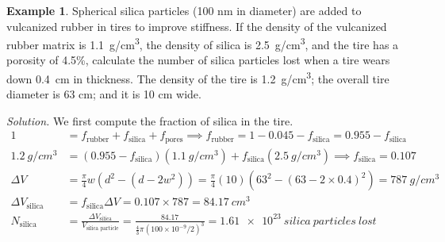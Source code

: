 \documentclass{article}
\theoremstyle{definition}
\newtheorem{example}[definition]{Example}
\begin{document}
\begin{example}
    Spherical silica particles (100 nm in diameter) are added to vulcanized rubber in tires to improve stiffness. If the density of the vulcanized rubber matrix is \SI{1.1}{g/cm^3}, the density of silica is \SI{2.5}{g/cm^3}, and the tire has a porosity of 4.5\%, calculate the number of silica particles lost when a tire wears down \SI{0.4}{cm} in thickness. The density of the tire is \SI{1.2}{g/cm^3}; the overall tire diameter is 63 cm; and it is 10 cm wide.

    \textit{Solution.} We first compute the fraction of silica in the tire.
    \begin{align*}
        1 &= f_{\text{rubber}} + f_{\text{silica}} + f_{\text{pores}} \implies f_{\text{rubber}} = 1 - 0.045 - f_{\text{silica}} = 0.955 - f_{\text{silica}} \\
        \SI{1.2}{g/cm^3} &= (0.955 - f_{\text{silica}}) (\SI{1.1}{g/cm^3}) + f_{\text{silica}} (\SI{2.5}{g/cm^3}) \implies f_{\text{silica}} = 0.107 \\
        \Delta V &= \frac{\pi}{4}w (d^2 - (d-2w^2)) = \frac{\pi}{4} (10) (63^2 - (63-2\times0.4)^2) = \SI{787}{g/cm^3} \\
        \Delta V_{\text{silica}} &= f_{\text{silica}} \Delta V = 0.107 \times 787 = \SI{84.17}{cm^3} \\
        N_{\text{silica}} &= \frac{\Delta V_{\text{silica}}}{V_{\text{silica particle}}} = \frac{84.17}{\frac{4}{3} \pi (100 \times 10^{-9} / 2)^3} = \SI{1.61e23}{silica\ particles\ lost}
    \end{align*}
\end{example}
\end{document}
